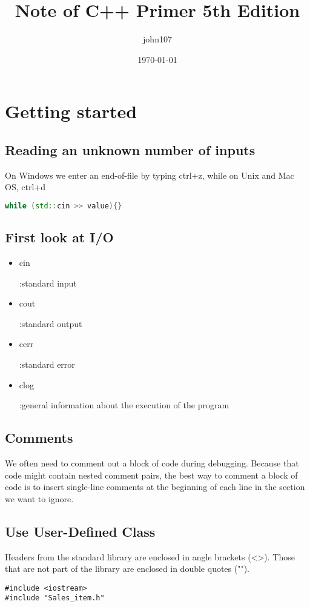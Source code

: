 \documentclass[UTF8]{ctexart}
\title{Note of C++ Primer 5th Edition }
\author{john107}
\date{\today}
\newcommand \qd[1] {\begin{qds} {#1} \end{qds}}
\begin{document}
\maketitle
\clearpage
\tableofcontents
\clearpage

\section{Getting started}

\subsection{Reading an unknown number of inputs}
On Windows we enter an end-of-file by typing ctrl+z, while on Unix and Mac OS, ctrl+d
\begin{lstlisting}[language=C++]
while (std::cin >> value){}
\end{lstlisting}

\subsection{First look at I/O}
\begin{itemize}
	\item{\qd{cin}:standard input}
	\item{\qd{cout}:standard output}
	\item{\qd{cerr}:standard error}
	\item{\qd{clog}:general information about the execution of the program}
\end{itemize}

\subsection{Comments}
We often need to comment out a  block of code during debugging. Because that code might contain nested comment  pairs, the best way to comment a block of code is to insert single-line comments at the beginning of each line in the section we want to ignore.

\subsection{Use User-Defined Class}
Headers from the standard library are enclosed in angle brackets (<>). Those that are not part of the library are enclosed in double quotes ("").
\begin{lstlisting}
#include <iostream>
#include "Sales_item.h"  
\end{lstlisting}
\end{document}
